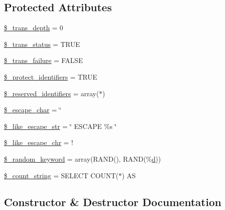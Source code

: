 \subsection*{Protected Attributes}
\begin{DoxyCompactItemize}
\item 
\hyperlink{class_c_i___d_b__driver_a0724b7f82d62f35ef5e150146ed2a27b}{\$\+\_\+trans\+\_\+depth} = 0
\item 
\hyperlink{class_c_i___d_b__driver_a93acf0189d34131e156c6eb4a48c2b5b}{\$\+\_\+trans\+\_\+status} = T\+R\+U\+E
\item 
\hyperlink{class_c_i___d_b__driver_afb63c722ff858ef7a4f662ec2930aad3}{\$\+\_\+trans\+\_\+failure} = F\+A\+L\+S\+E
\item 
\hyperlink{class_c_i___d_b__driver_a2e8a156a3c2abda43a4f160bcb5252e9}{\$\+\_\+protect\+\_\+identifiers} = T\+R\+U\+E
\item 
\hyperlink{class_c_i___d_b__driver_aa3298c4c62fbee8bb09f1b75b633fb0d}{\$\+\_\+reserved\+\_\+identifiers} = array(\textquotesingle{}$\ast$\textquotesingle{})
\item 
\hyperlink{class_c_i___d_b__driver_aaec2fb0112850159063a8e47ad3aed6e}{\$\+\_\+escape\+\_\+char} = \textquotesingle{}\char`\"{}\textquotesingle{}
\item 
\hyperlink{class_c_i___d_b__driver_adf86ecadf3d0e1ce3f5e0eaeeb3867ae}{\$\+\_\+like\+\_\+escape\+\_\+str} = \char`\"{} E\+S\+C\+A\+P\+E \textquotesingle{}\%s\textquotesingle{} \char`\"{}
\item 
\hyperlink{class_c_i___d_b__driver_a668acfd923d0342389cd3a614628cf2a}{\$\+\_\+like\+\_\+escape\+\_\+chr} = \textquotesingle{}!\textquotesingle{}
\item 
\hyperlink{class_c_i___d_b__driver_a10213aa6e05f6d924d3277bb1d2fea00}{\$\+\_\+random\+\_\+keyword} = array(\textquotesingle{}R\+A\+N\+D()\textquotesingle{}, \textquotesingle{}R\+A\+N\+D(\%\hyperlink{assets_2js_2bootstrap_8min_8js_aeb337d295abaddb5ec3cb34cc2e2bbc9}{d})\textquotesingle{})
\item 
\hyperlink{class_c_i___d_b__driver_a06c80bac2ecbd0557827e96949c23097}{\$\+\_\+count\+\_\+string} = \textquotesingle{}S\+E\+L\+E\+C\+T C\+O\+U\+N\+T($\ast$) A\+S \textquotesingle{}
\end{DoxyCompactItemize}


\subsection{Constructor \& Destructor Documentation}
\hypertarget{class_c_i___d_b__driver_a9162320adff1a1a4afd7f2372f753a3e}{}
